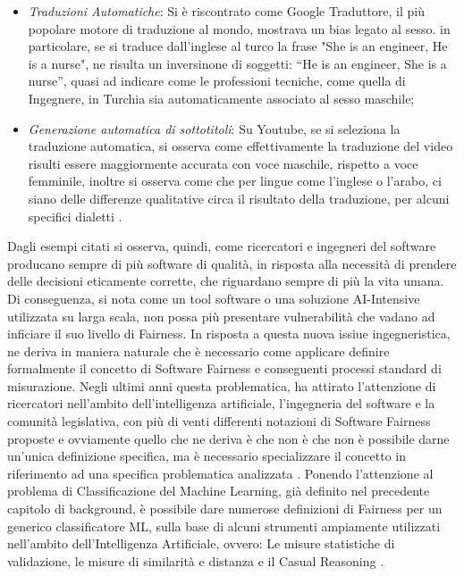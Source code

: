 \begin{itemize}
    \item \emph{Traduzioni Automatiche}: Si è riscontrato come Google Traduttore, il più popolare motore di traduzione al mondo, mostrava un bias legato al sesso. in particolare, se si traduce dall'inglese al turco la frase "She is an engineer, He is a nurse", ne risulta un inversinone di soggetti: “He is an engineer, She is a nurse”, quasi ad indicare come le professioni tecniche, come quella di Ingegnere, in Turchia sia automaticamente associato al sesso maschile\cite{biasblack2016propublica};
    
    \item \emph{Generazione automatica di sottotitoli}: Su Youtube, se si seleziona la traduzione automatica, si osserva come effettivamente la traduzione del video risulti essere maggiormente accurata con voce maschile, rispetto a voce femminile, inoltre si osserva come che per lingue come l'inglese o l'arabo, ci siano delle differenze qualitative circa il risultato della traduzione, per alcuni specifici dialetti \cite{tatman-2017-gender}.
\end{itemize}

Dagli esempi citati si osserva, quindi, come ricercatori e ingegneri del software producano sempre di più software di qualità, in risposta alla necessità di prendere delle decisioni eticamente corrette, che riguardano sempre di più la vita umana\cite{biasInML}. Di conseguenza, si nota come un tool software o una soluzione AI-Intensive utilizzata su larga scala, non possa più presentare vulnerabilità che vadano ad inficiare il suo livello di Fairness. In risposta a questa nuova issiue ingegneristica, ne deriva in maniera naturale che è necessario come applicare definire formalmente il concetto di Software Fairness e conseguenti processi standard di misurazione.
 Negli ultimi anni questa problematica, ha attirato l'attenzione di ricercatori nell'ambito dell'intelligenza artificiale, l'ingegneria del software e la comunità legislativa, con più di venti differenti notazioni di Software Fairness proposte e ovviamente quello che ne deriva è che non è che non è possibile darne un'unica definizione specifica, ma è necessario specializzare il concetto in riferimento ad una specifica problematica analizzata \cite{FairnessDefinitionExplained}.  Ponendo l'attenzione al problema di Classificazione del Machine Learning, già definito nel precedente capitolo di background, è possibile dare numerose definizioni di Fairness per un generico classificatore ML, sulla base di alcuni strumenti ampiamente utilizzati nell'ambito dell'Intelligenza Artificiale, ovvero: Le misure statistiche di validazione, le misure di similarità e distanza e il Casual Reasoning \cite{FairnessDefinitionExplained}.
 
